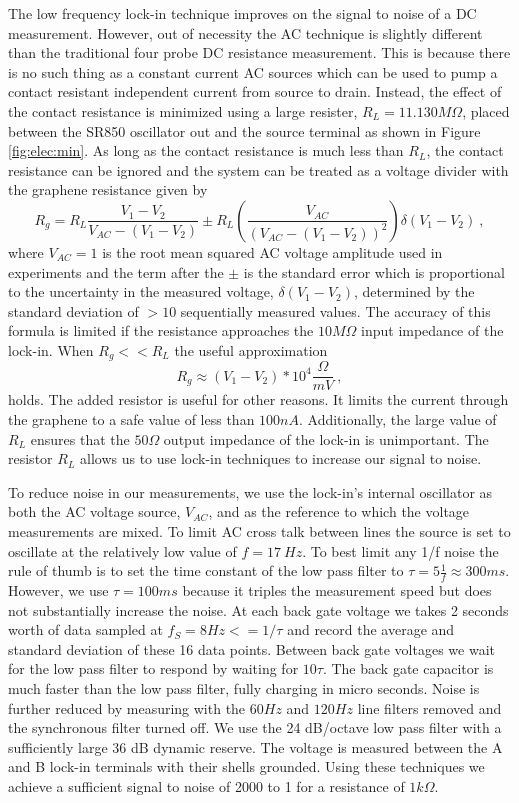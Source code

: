 The low frequency lock-in technique improves on the signal to noise of a DC measurement.
However, out of necessity the AC technique is slightly different than the traditional four probe DC resistance measurement.
This is because there is no such thing as a constant current AC sources which can be used to pump a contact resistant independent current from source to drain.
Instead, the effect of the contact resistance is minimized using a large resister, $R_L=11.130 M\Omega$, placed between the SR850 oscillator out and the source terminal as shown in Figure \ref{fig:elec:min}.
As long as the contact resistance is much less than $R_L$, the contact resistance can be ignored and the system can be treated as a voltage divider with the graphene resistance given by
\begin{equation*}
	R_g=R_{L} \frac{V_1-V_2}{V_{AC}-(V_1-V_2)} \pm R_{L} \left( \frac{V_{AC}}{(V_{AC}-(V_1-V_2))^2} \right) \delta (V_1-V_2) \ ,
\end{equation*}
where $V_{AC}=1$ is the root mean squared AC voltage amplitude used in experiments and the term after the $\pm$ is the standard error which is proportional to the uncertainty in the measured voltage, $\delta (V_1-V_2)$, determined by the standard deviation of $>10$ sequentially measured values.
The accuracy of this formula is limited if the resistance approaches the $10 M\Omega$ input impedance of the lock-in.
When $R_g<<R_L$ the useful approximation
\begin{equation*}
	R_g \approx (V_1-V_2) * 10^4 \frac{\Omega}{mV} \ ,
\end{equation*} 
holds.
The added resistor is useful for other reasons.
It limits the current through the graphene to a safe value of less than $100 nA$.
Additionally, the large value of $R_L$ ensures that the $50 \Omega$ output impedance of the lock-in is unimportant.
The resistor $R_L$ allows us to use lock-in techniques to increase our signal to noise.

To reduce noise in our measurements, we use the lock-in's internal oscillator as both the AC voltage source, $V_{AC}$, and as the reference to which the voltage measurements are mixed.
To limit AC cross talk between lines the source is set to oscillate at the relatively low value of $f=17 \ Hz$.
To best limit any 1/f noise the rule of thumb is to set the time constant of the low pass filter to $\tau=5 \frac{1}{f} \approx 300 ms$.
However, we use $\tau=100 ms$ because it triples the measurement speed but does not substantially increase the noise.
At each back gate voltage we takes 2 seconds worth of data sampled at $f_S=8Hz<=1/\tau$ and record the average and standard deviation of these 16 data points.
Between back gate voltages we wait for the low pass filter to respond by waiting for $10 \tau$.
The back gate capacitor is much faster than the low pass filter, fully charging in micro seconds.
Noise is further reduced by measuring with the $60 Hz$ and $120 Hz$ line filters removed and the synchronous filter turned off.
We use the 24 dB/octave low pass filter with a sufficiently large 36 dB dynamic reserve.
The voltage is measured between the A and B lock-in terminals with their shells grounded.
Using these techniques we achieve a sufficient signal to noise of 2000 to 1 for a resistance of $1 k\Omega$.

